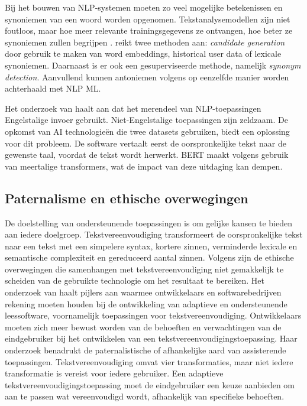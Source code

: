 Bij het bouwen van NLP-systemen moeten zo veel mogelijke betekenissen en synoniemen van een woord worden opgenomen. Tekstanalysemodellen zijn niet foutloos, maar hoe meer relevante trainingsgegevens ze ontvangen, hoe beter ze synoniemen zullen begrijpen \autocite{Roldos2020}. \textcite{Dandekar2016} reikt twee methoden aan: \textit{candidate generation} door gebruik te maken van word embeddings, historical user data of lexicale synoniemen. Daarnaast is er ook een gesuperviseerde methode, namelijk \textit{synonym detection}. Aanvullend kunnen antoniemen volgens \textcite{Dandekar2016} op eenzelfde manier worden achterhaald met NLP ML.

Het onderzoek van \textcite{Sciforce2020} haalt aan dat het merendeel van NLP-toepassingen Engelstalige invoer gebruikt. Niet-Engelstalige toepassingen zijn zeldzaam. De opkomst van AI technologieën die twee datasets gebruiken, biedt een oplossing voor dit probleem. De software vertaalt eerst de oorspronkelijke tekst naar de gewenste taal, voordat de tekst wordt herwerkt. BERT maakt volgens \textcite{Roldos2020} gebruik van meertalige transformers, wat de impact van deze uitdaging kan dempen.

\subsection{Paternalisme en ethische overwegingen}

De doelstelling van ondersteunende toepassingen is om gelijke kansen te bieden aan iedere doelgroep. Tekstvereenvoudiging transformeert de oorspronkelijke tekst naar een tekst met een simpelere syntax, kortere zinnen, verminderde lexicale en semantische complexiteit en gereduceerd aantal zinnen. Volgens \textcite{Niemeijer2010} zijn de ethische overwegingen die samenhangen met tekstvereenvoudiging niet gemakkelijk te scheiden van de gebruikte technologie om het resultaat te bereiken. Het onderzoek van \textcite{Gooding2022} haalt pijlers aan waarmee ontwikkelaars en softwarebedrijven rekening moeten houden bij de ontwikkeling van adaptieve en ondersteunende leessoftware, voornamelijk toepassingen voor tekstvereenvoudiging. Ontwikkelaars moeten zich meer bewust worden van de behoeften en verwachtingen van de eindgebruiker bij het ontwikkelen van een tekstvereenvoudigingstoepassing. Haar onderzoek benadrukt de paternalistische of afhankelijke aard van assisterende toepassingen. Tekstvereenvoudiging omvat vier transformaties, maar niet iedere transformatie is vereist voor iedere gebruiker. Een adaptieve tekstvereenvoudigingstoepassing moet de eindgebruiker een keuze aanbieden om aan te passen wat vereenvoudigd wordt, afhankelijk van specifieke behoeften.

